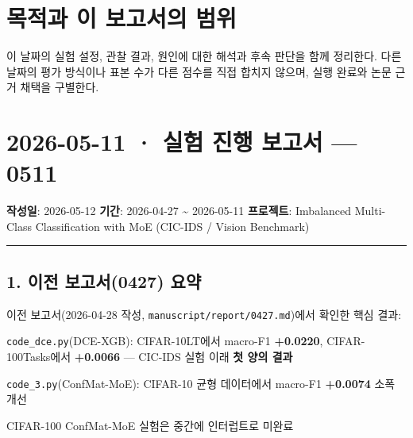 




\section*{목적과 이 보고서의 범위}

이 날짜의 실험 설정, 관찰 결과, 원인에 대한 해석과 후속 판단을 함께 정리한다. 다른 날짜의 평가 방식이나 표본 수가 다른 점수를 직접 합치지 않으며, 실행 완료와 논문 근거 채택을 구별한다.


\section{2026-05-11 · 실험 진행 보고서 — 0511}
\label{report:20260511_0511}
\textbf{작성일}: 2026-05-12 \textbf{기간}: 2026-04-27 \textasciitilde{} 2026-05-11 \textbf{프로젝트}: Imbalanced Multi-Class Classification with MoE (CIC-IDS /\allowbreak{} Vision Benchmark)


\medskip\hrule\medskip
\subsection{1. 이전 보고서(0427) 요약}
이전 보고서(2026-04-28 작성, \texttt{manuscri\allowbreak{}pt/\allowbreak{}\allowbreak{}repor\allowbreak{}t/\allowbreak{}\allowbreak{}0427.\allowbreak{}m\allowbreak{}d})에서 확인한 핵심 결과:

\par\noindent \textbullet\enspace \texttt{code\_\allowbreak{}\allowbreak{}dce\allowbreak{}.\allowbreak{}py}(DCE-XGB): CIFAR-10LT에서 macro-F1 \textbf{+\allowbreak{}0.0220}, CIFAR-100Tasks에서 \textbf{+\allowbreak{}0.0066} — CIC-IDS 실험 이래 \textbf{첫 양의 결과}


\par\noindent \textbullet\enspace \texttt{code\_\allowbreak{}\allowbreak{}3.\allowbreak{}p\allowbreak{}y}(ConfMat-MoE): CIFAR-10 균형 데이터에서 macro-F1 \textbf{+\allowbreak{}0.0074} 소폭 개선


\par\noindent \textbullet\enspace CIFAR-100 ConfMat-MoE 실험은 중간에 인터럽트로 미완료


